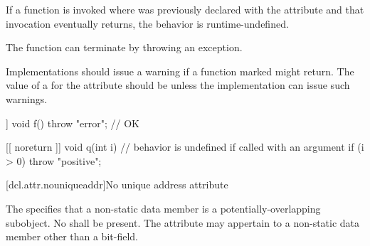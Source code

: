 \pnum
If a function  is invoked where  was previously declared with the 
attribute and that invocation eventually returns,
the behavior is runtime-undefined.
%
%
%
%
%
\begin{note}
The function can
terminate by throwing an exception.
\end{note}


\pnum
\recommended
Implementations should issue a
warning if a function marked \tcode{[[noreturn]]} might return.
The value of
a  for the  attribute
should be  unless the implementation can issue such warnings.

\pnum
\begin{example}
\begin{codeblock}
[[ noreturn ]] void f() {
  throw "error";                // OK
}

[[ noreturn ]] void q(int i) {  // behavior is undefined if called with an argument 
  if (i > 0)
    throw "positive";
}
\end{codeblock}
\end{example}

[dcl.attr.nouniqueaddr]{No unique address attribute}%

\pnum
The  
specifies that a non-static data member
is a potentially-overlapping subobject.
No  shall be present.
The attribute may appertain to a non-static data member
other than a bit-field.


